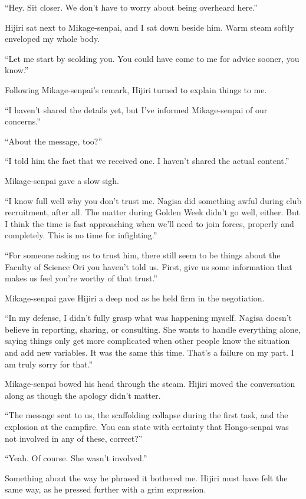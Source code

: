 \documentclass[
    a4paper,
    12pt,
    twoside,
    openany,
    UTF8,
    fontset=windows
]{ctexbook}
\begin{document}
``Hey. Sit closer. We don't have to worry about being overheard here.''

Hijiri sat next to Mikage-senpai, and I sat down beside him. Warm steam softly enveloped my whole body.

``Let me start by scolding you. You could have come to me for advice sooner, you know.''

Following Mikage-senpai's remark, Hijiri turned to explain things to me.

``I haven't shared the details yet, but I've informed Mikage-senpai of our concerns.''

``About the message, too?''

``I told him the fact that we received one. I haven't shared the actual content.''

Mikage-senpai gave a slow sigh.

``I know full well why you don't trust me. Nagisa did something awful during club recruitment, after all. The matter during Golden Week didn't go well, either. But I think the time is fast approaching when we'll need to join forces, properly and completely. This is no time for infighting.''

``For someone asking us to trust him, there still seem to be things about the Faculty of Science Ori you haven't told us. First, give us some information that makes us feel you're worthy of that trust.''

Mikage-senpai gave Hijiri a deep nod as he held firm in the negotiation.

``In my defense, I didn't fully grasp what was happening myself. Nagisa doesn't believe in reporting, sharing, or consulting. She wants to handle everything alone, saying things only get more complicated when other people know the situation and add new variables. It was the same this time. That's a failure on my part. I am truly sorry for that.''

Mikage-senpai bowed his head through the steam. Hijiri moved the conversation along as though the apology didn't matter.

``The message sent to us, the scaffolding collapse during the first task, and the explosion at the campfire. You can state with certainty that Hongo-senpai was not involved in any of these, correct?''

``Yeah. Of course. She wasn't involved.''

Something about the way he phrased it bothered me. Hijiri must have felt the same way, as he pressed further with a grim expression.
\end{document}
